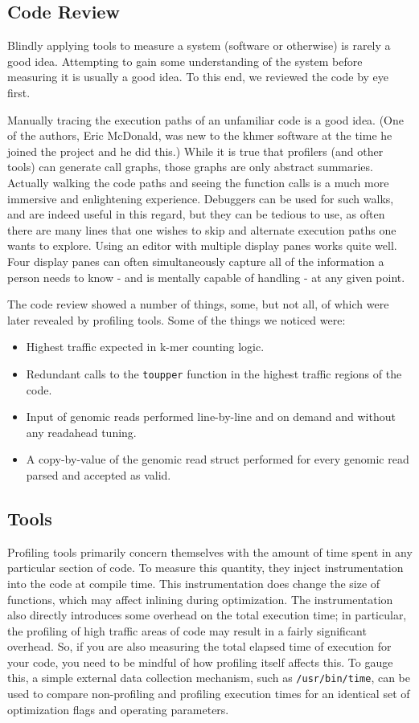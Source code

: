 \documentclass{article}
\begin{document}
\subsection{Code Review}

Blindly applying tools to measure a system (software or otherwise) is rarely a good idea. Attempting to gain some understanding of the system before measuring it is usually a good idea. To this end, we reviewed the code by eye first.

Manually tracing the execution paths of an unfamiliar code is a good idea. (One of the authors, Eric McDonald, was new to the khmer software at the time he joined the project and he did this.) While it is true that profilers (and other tools) can generate call graphs, those graphs are only abstract summaries. Actually walking the code paths and seeing the function calls is a much more immersive and enlightening experience. Debuggers can be used for such walks, and are indeed useful in this regard, but they can be tedious to use, as often there are many lines that one wishes to skip and alternate execution paths one wants to explore. Using an editor with multiple display panes works quite well. Four display panes can often simultaneously capture all of the information a person needs to know - and is mentally capable of handling - at any given point.

The code review showed a number of things, some, but not all, of which were later revealed by profiling tools. Some of the things we noticed were:

\begin{itemize}
\item Highest traffic expected in k-mer counting logic.
\item Redundant calls to the \texttt{toupper} function in the highest traffic regions of the code.
\item Input of genomic reads performed line-by-line and on demand and without any readahead tuning.
\item A copy-by-value of the genomic read struct performed for every genomic read parsed and accepted as valid.
\end{itemize}

\subsection{Tools}

Profiling tools primarily concern themselves with the amount of time spent in any particular section of code. To measure this quantity, they inject instrumentation into the code at compile time. This instrumentation does change the size of functions, which may affect inlining during optimization. The instrumentation also directly introduces some overhead on the total execution time; in particular, the profiling of high traffic areas of code may result in a fairly significant overhead. So, if you are also measuring the total elapsed time of execution for your code, you need to be mindful of how profiling itself affects this. To gauge this, a simple external data collection mechanism, such as \texttt{/usr/bin/time}, can be used to compare non-profiling and profiling execution times for an identical set of optimization flags and operating parameters.
\end{document}
